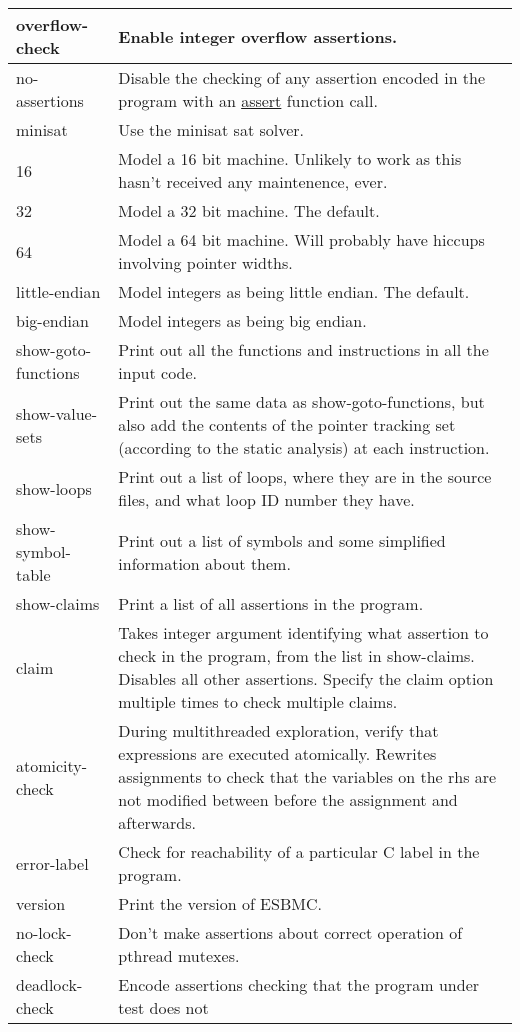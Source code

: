 \documentclass{article}
\begin{document}
\begin{longtable}{| p{} | p{} |}
\hline
overflow-check & Enable integer overflow assertions.\\
\hline
no-assertions & Disable the checking of any assertion encoded in the program
with an \url{assert} function call.\\
\hline
minisat & Use the minisat sat solver.\\
\hline
16 & Model a 16 bit machine. Unlikely to work as this hasn't received any
maintenence, ever.\\
\hline
32 & Model a 32 bit machine. The default.\\
\hline
64 & Model a 64 bit machine. Will probably have hiccups involving pointer
widths.\\
\hline
little-endian & Model integers as being little endian. The default.\\
\hline
big-endian & Model integers as being big endian.\\
\hline
show-goto-functions & Print out all the functions and instructions in all the
input code.\\
\hline
show-value-sets & Print out the same data as show-goto-functions, but also
add the contents of the pointer tracking set (according to the static analysis)
at each instruction.\\
\hline
show-loops & Print out a list of loops, where they are in the source files,
and what loop ID number they have.\\
\hline
show-symbol-table & Print out a list of symbols and some simplified
information about them.\\
\hline
show-claims & Print a list of all assertions in the program.\\
\hline
claim & Takes integer argument identifying what assertion to check in the
program, from the list in show-claims. Disables all other assertions. Specify
the claim option multiple times to check multiple claims.\\ 
\hline
atomicity-check & During multithreaded exploration, verify that expressions
are executed atomically. Rewrites assignments to check that the variables on the
rhs are not modified between before the assignment and afterwards.\\
\hline
error-label & Check for reachability of a particular C label in the program.\\
\hline
version & Print the version of ESBMC.\\
\hline
no-lock-check & Don't make assertions about correct operation of pthread
mutexes.\\
\hline
deadlock-check & Encode assertions checking that the program under test does not

\end{longtable}
\end{document}
